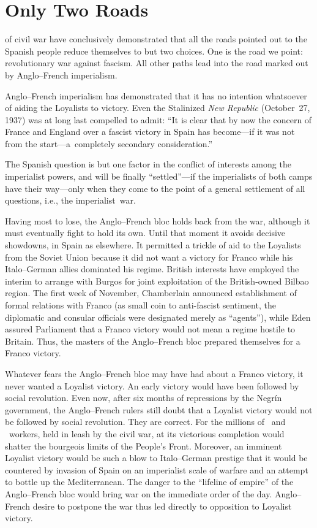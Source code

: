 \chapter{Only Two Roads}

 of civil war have conclusively demonstrated that all the roads pointed out to the Spanish people reduce themselves to but two choices. One is the road we point: revolutionary war against fascism. All other paths lead into the road marked out by Anglo--French imperialism.

Anglo--French imperialism has demonstrated that it has no intention whatsoever of aiding the Loyalists to victory. Even the Stalinized \emph{New Republic} (October~27, 1937) was at long last compelled to admit: ``It is clear that by now the concern of France and England over a fascist victory in Spain has become—if it was not from the start—a~completely secondary consideration.''

The Spanish question is but one factor in the conflict of interests among the imperialist powers, and will be finally ``settled''—if the imperialists of both camps have their way—only when they come to the point of a general settlement of all questions, i.e., the imperialist~war.

Having most to lose, the Anglo--French bloc holds back from the war, although it must eventually fight to hold its own. Until that moment it avoids decisive showdowns, in Spain as elsewhere. It permitted a trickle of aid to the Loyalists from the Soviet Union because it did not want a victory for Franco while his Italo--German allies dominated his regime. British interests have employed the interim to arrange with Burgos for joint exploitation of the British-owned Bilbao region. The first week of November, Chamberlain announced establishment of formal relations with Franco (as small coin to anti-fascist sentiment, the diplomatic and consular officials were designated merely as ``agents''), while Eden assured Parliament that a Franco victory would not mean a regime hostile to Britain. Thus, the masters of the Anglo--French bloc prepared themselves for a Franco victory.

Whatever fears the Anglo--French bloc may have had about a Fran\-co victory, it never wanted a Loyalist victory. An early victory would have been followed by social revolution. Even now, after six months of repressions by the Negr\'in government, the Anglo--French rulers still doubt that a Loyalist victory would not be followed by social revolution. They are correct. For the millions of \CNT\ and \UGT\ workers, held in leash by the civil war, at its victorious completion would shatter the bourgeois limits of the People’s Front. Moreover, an imminent Loyalist victory would be such a blow to Italo--German prestige that it would be countered by invasion of Spain on an imperialist scale of warfare and an attempt to bottle up the Mediterranean. The danger to the ``lifeline of empire'' of the Anglo--French bloc would bring war on the immediate order of the day. Anglo--French desire to postpone the war thus led directly to opposition to Loyalist victory.

